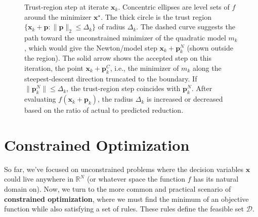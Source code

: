 \begin{figure}[H]
        \caption{Trust-region step at iterate $\mathbf{x}_k$. Concentric ellipses are level sets of $f$ around the minimizer $\mathbf{x}^\star$. The thick circle is the trust region $\{\mathbf{x}_k+\mathbf{p}:\|\mathbf{p}\|_2\le\Delta_k\}$ of radius $\Delta_k$. The dashed curve suggests the path toward the unconstrained minimizer of the quadratic model $m_k$, which would give the Newton/model step $\mathbf{x}_k+\mathbf{p}_k^{N}$ (shown outside the region). The solid arrow shows the accepted step on this iteration, the point $\mathbf{x}_k+\mathbf{p}_k^{C}$, i.e., the minimizer of $m_k$ along the steepest-descent direction truncated to the boundary. If $\|\mathbf{p}_k^{N}\|\le\Delta_k$, the trust-region step coincides with $\mathbf{p}_k^{N}$. After evaluating $f(\mathbf{x}_k+\mathbf{p}_k)$, the radius $\Delta_k$ is increased or decreased based on the ratio of actual to predicted reduction.}
        \label{fig:trust-region}
\end{figure}

\section{Constrained Optimization}
\label{sec:constrained-optimization}
So far, we've focused on unconstrained problems where the decision variables $\mathbf{x}$ could live anywhere in $\mathbb{R}^N$ (or whatever space the function $f$ has its natural domain on). Now, we turn to the more common and practical scenario of \textbf{constrained optimization}, where we must find the minimum of an objective function while also satisfying a set of rules. These rules define the feasible set $\mathcal{D}$.

